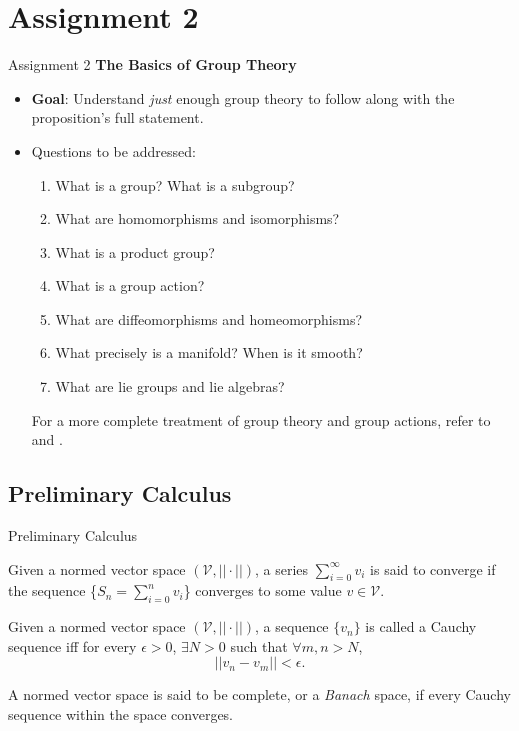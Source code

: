 \documentclass{beamer}
\begin{document}
\section{Assignment 2}
\begin{frame}{Assignment 2}
  \centering \textbf{The Basics of Group Theory}
  \begin{itemize}
    \item \textbf{Goal}: Understand \textit{just} enough group theory %
      to follow along with the proposition's full statement.
    \item Questions to be addressed:
      \begin{enumerate}
      \item What is a group? What is a subgroup?
      \item What are homomorphisms and isomorphisms?
      \item What is a product group?
      \item What is a group action?
      \item What are diffeomorphisms and homeomorphisms?
      \item What precisely is a manifold? When is it smooth?
      \item What are lie groups and lie algebras?
      \end{enumerate}
      For a more complete treatment of group theory and group actions, refer to \cite{Artin:1998} and \cite{gallier2020differential}.
  \end{itemize}
\end{frame}
\subsection{Preliminary Calculus}
\begin{frame}{Preliminary Calculus}
  \begin{definition}
    Given a normed vector space $(\mathcal{V}, ||\cdot||)$, a series $\sum_{i = 0}^{\infty} v_i$ is said to converge if the sequence \{$S_n = \sum_{i = 0}^{n} v_i$\} converges to some value $v \in \mathcal{V}$.
  \end{definition}
  \begin{definition}
    Given a normed vector space $(\mathcal{V}, ||\cdot||)$, a sequence $\{v_n\}$ is called a Cauchy sequence iff for every $\epsilon > 0$, $\exists N > 0$ such that $\forall m, n > N$, 
      \[ 
      ||v_n - v_m|| < \epsilon
      .\]
      
  \end{definition}
  \begin{definition}
    A normed vector space is said to be complete, or a \textit{Banach} space, if every Cauchy sequence within the space converges.
  \end{definition}
\end{frame}
\end{document}
